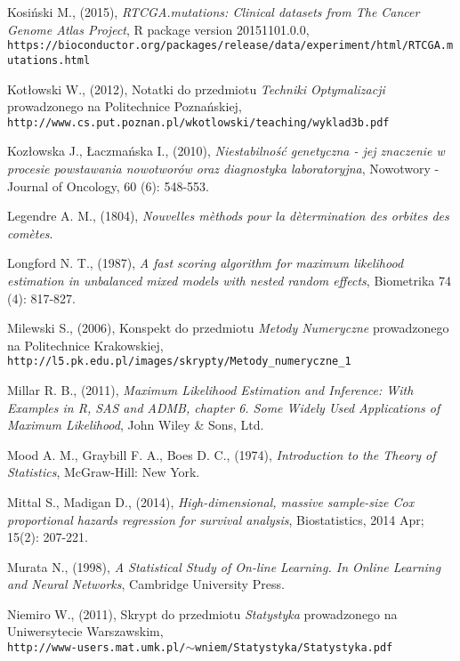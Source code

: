 \begin{thebibliography}{99}
 Kosiński M., (2015), \textit{RTCGA.mutations: Clinical datasets from The Cancer Genome Atlas Project}, R package version 20151101.0.0, \\ \texttt{https://bioconductor.org/packages/release/data/experiment/html/RTCGA.mutations.html}

 Kotłowski W., (2012), Notatki do przedmiotu \textit{Techniki Optymalizacji} prowadzonego na Politechnice Poznańskiej, \\ \texttt{http://www.cs.put.poznan.pl/wkotlowski/teaching/wyklad3b.pdf}

 Kozłowska J., Łaczmańska I., (2010), \textit{Niestabilność genetyczna - jej znaczenie w procesie powstawania nowotworów oraz diagnostyka laboratoryjna}, Nowotwory - Journal of Oncology, 60 (6): 548-553.

 Legendre A. M., (1804), \textit{Nouvelles m\`ethods pour la d\`etermination des orbites des com\`etes}.


 Longford N. T., (1987), \textit{A fast scoring algorithm for maximum likelihood estimation in unbalanced mixed models with nested random effects}, Biometrika 74 (4): 817-827.

 Milewski S., (2006), Konspekt do przedmiotu \textit{Metody Numeryczne} prowadzonego na Politechnice Krakowskiej, \\ \texttt{http://l5.pk.edu.pl/images/skrypty/Metody\_numeryczne\_1}

 Millar R. B., (2011), \textit{Maximum Likelihood Estimation and Inference: With Examples in R, SAS and ADMB, chapter 6. Some Widely Used Applications of Maximum Likelihood}, John Wiley \& Sons, Ltd.

 Mood A. M., Graybill F. A., Boes D. C., (1974), \textit{Introduction to the Theory of Statistics},
McGraw-Hill: New York.

 Mittal S., Madigan D., (2014), \textit{High-dimensional, massive sample-size Cox proportional hazards regression for survival analysis}, Biostatistics, 2014 Apr; 15(2): 207-221.

 Murata N., (1998), \textit{A Statistical Study of On-line Learning. In Online Learning
and Neural Networks}, Cambridge University Press.

 Niemiro W., (2011), Skrypt do przedmiotu \textit{Statystyka} prowadzonego na Uniwersytecie Warszawskim, \\ \texttt{http://www-users.mat.umk.pl/$\sim$wniem/Statystyka/Statystyka.pdf}


\end{thebibliography}
